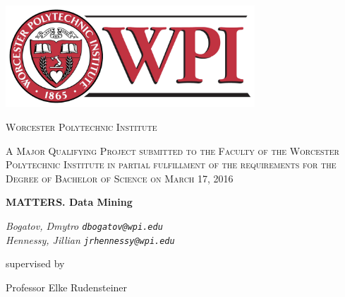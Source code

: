 \begin{titlepage}
	\centering
	
    \includegraphics[width=0.7\textwidth]{images/wpiLogo.png}\par\vspace{0.5cm}
	
    {\scshape\Large Worcester Polytechnic Institute \par}
	\vspace{1cm}
	
    {\scshape\large A Major Qualifying Project submitted to the Faculty of the Worcester Polytechnic Institute in partial fulfillment of the requirements for the Degree of Bachelor of Science on March 17, 2016 \par}
	\vspace{1.25cm}
	
    {\LARGE\bfseries MATTERS. Data Mining \par}
	\vspace{1cm}
	
    {\large\itshape 
        Bogatov, Dmytro \texttt{dbogatov@wpi.edu} \\
        Hennessy, Jillian \texttt{jrhennessy@wpi.edu}
     \par}
	\vfill
	
    supervised by\par
	Professor Elke Rudensteiner

	\vfill
    
\end{titlepage}